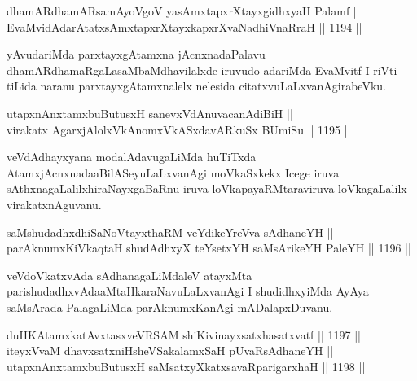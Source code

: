 
\begin{shl}
dhamARdhamARsamAyoVgoV yasAmxtapxrXtayxgidhxyaH Palamf ||  \\
EvaMvidAdarAtatxsAmxtapxrXtayxkapxrXvaNadhiVnaRraH \hfill || 1194 ||  
\end{shl}

\begin{artha}
yAvudariMda parxtayxgAtamxna jAcnxnadaPalavu dhamARdhamaRgaLa\break saMbaMdhavilalxde iruvudo adariMda EvaMvitf I riVti tiLida naranu parxtayxgAtamxnalelx nelesida citatxvuLaLxvanAgirabeVku.
\end{artha}

\begin{shl}
utapxnAnxtamxbuButusxH sanevxVdAnuvacanAdiBiH || \\
virakatx AgarxjAlolxVkAnomxVkASxdavARkuSx BUmiSu \hfill || 1195 || 
\end{shl}

\begin{artha}
veVdAdhayxyana modalAdavugaLiMda huTiTxda AtamxjAcnxnada\break aBilASeyuLaLxvanAgi moVkaSxkekx Icege iruva sAthxnagaLalilx\break hiraNayxgaBaRnu iruva loVkapayaRMtaraviruva loVkagaLalilx virakatxnAguvanu.
\end{artha}


\begin{shl}
saMshudadhxdhiSaNoV\s tayxthaRM veYdikeYreVva sAdhaneYH || \\
parAknumxKiVkaqtaH shudAdhxyX teYsetxYH saMsArikeYH PaleYH \hfill || 1196 ||  
\end{shl}

\begin{artha}
veVdoVkatxvAda sAdhanagaLiMdaleV atayxMta parishudadhxvAda\break aMtaHkaraNavuLaLxvanAgi I shudidhxyiMda AyAya saMsArada PalagaLiMda parAknumxKanAgi mADalapxDuvanu.
\end{artha}


\begin{shl}
duHKAtamxkatAvxtasxveVRSAM shiKivinayxsatxhasatxvatf \hfill || 1197 ||  \\
iteyxVvaM dhavxsatxniHsheVSakalamxSaH pUvaRsAdhaneYH || \\
utapxnAnxtamxbuButusxH saMsatxyXkatxsavaRparigarxhaH \hfill || 1198 ||  
\end{shl}

